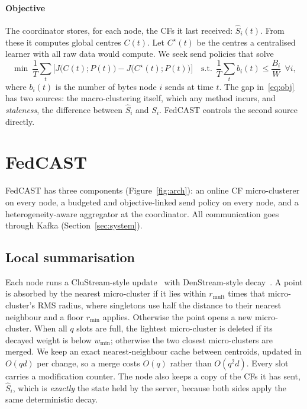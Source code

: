 \paragraph{Objective} The coordinator stores, for each node, the CFs it last received: $\hat S_i(t)$. From these it computes global centres $C(t)$. Let $C^\star(t)$ be the centres a centralised learner with all raw data would compute. We seek send policies that solve
\begin{equation}\label{eq:obj}
\min\ \frac1T\sum_{t}\Big[J\big(C(t);P(t)\big)-J\big(C^\star(t);P(t)\big)\Big]\quad
\text{s.t.}\ \ \frac1T\sum_t b_i(t)\le \frac{B_i}{W}\ \ \forall i,
\end{equation}
where $b_i(t)$ is the number of bytes node $i$ sends at time $t$. The gap in~\eqref{eq:obj} has two sources: the macro-clustering itself, which any method incurs, and \emph{staleness}, the difference between $\hat S_i$ and $S_i$. FedCAST controls the second source directly.

\section{FedCAST}\label{sec:method}

FedCAST has three components (Figure~\ref{fig:arch}): an online CF micro-clusterer on every node, a budgeted and objective-linked send policy on every node, and a heterogeneity-aware aggregator at the coordinator. All communication goes through Kafka (Section~\ref{sec:system}).

\subsection{Local summarisation}
Each node runs a CluStream-style update~\cite{aggarwal2003clustream} with DenStream-style decay~\cite{cao2006denstream}. A point is absorbed by the nearest micro-cluster if it lies within $r_\text{mult}$ times that micro-cluster's RMS radius, where singletons use half the distance to their nearest neighbour and a floor $r_\text{min}$ applies. Otherwise the point opens a new micro-cluster. When all $q$ slots are full, the lightest micro-cluster is deleted if its decayed weight is below $w_\text{min}$; otherwise the two closest micro-clusters are merged. We keep an exact nearest-neighbour cache between centroids, updated in $O(qd)$ per change, so a merge costs $O(q)$ rather than $O(q^2d)$. Every slot carries a modification counter. The node also keeps a copy of the CFs it has sent, $\hat S_i$, which is \emph{exactly} the state held by the server, because both sides apply the same deterministic decay.


